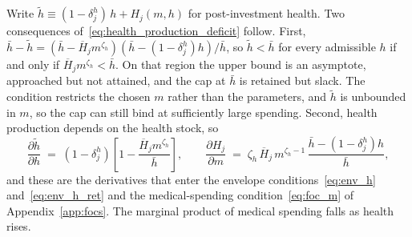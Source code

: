 \documentclass[12pt,a4paper]{article}
\begin{document}
Write $\tilde h \equiv (1-\delta^h_j)\,h + H_j(m,h)$ for post-investment health. Two consequences of~\eqref{eq:health_production_deficit} follow. First, $\bar h - \tilde h = (\bar h - \overline{H}_j m^{\zeta_h})(\bar h - (1-\delta^h_j)h)/\bar h$, so $\tilde h < \bar h$ for every admissible $h$ if and only if $\overline{H}_j m^{\zeta_h} < \bar h$. On that region the upper bound is an asymptote, approached but not attained, and the cap at $\bar h$ is retained but slack. The condition restricts the chosen $m$ rather than the parameters, and $\tilde h$ is unbounded in $m$, so the cap can still bind at sufficiently large spending. Second, health production depends on the health stock, so
\begin{equation}
\label{eq:dh_dh}
\frac{\partial \tilde h}{\partial h} \;=\; (1-\delta^h_j)\left[1 - \frac{\overline{H}_j m^{\zeta_h}}{\bar h}\right],
\qquad
\frac{\partial H_j}{\partial m} \;=\; \zeta_h\, \overline{H}_j\, m^{\zeta_h - 1}\,\frac{\bar h - (1-\delta^h_j)h}{\bar h},
\end{equation}
and these are the derivatives that enter the envelope conditions~\eqref{eq:env_h} and~\eqref{eq:env_h_ret} and the medical-spending condition~\eqref{eq:foc_m} of Appendix~\ref{app:focs}. The marginal product of medical spending falls as health rises.
\end{document}

